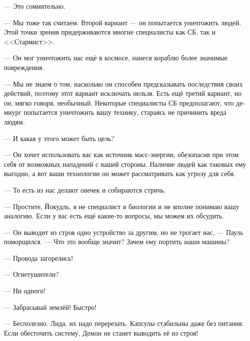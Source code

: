 \documentclass[a4paper,10pt,fleqn]{book}\usepackage{polyglossia}\setdefaultlanguage[babelshorthands=true]{russian}\setotherlanguage{english}\defaultfontfeatures{Ligatures=TeX,Mapping=tex-text}\usepackage{xcolor}\newcommand{\ml}[3]{#2}
\newcommand{\asterism}{\vspace{1em}{\centering\Large\bfseries$\ast~\ast~\ast$\par}\vspace{1em}}
\begin{document}
\ml{$0$}
{--- Это сомнительно.}
{``Hard to believe.''}

--- Мы тоже так считаем.
\ml{$0$}
{Второй вариант --- он попытается уничтожить людей.}
{The second option: it will try to wipe humans out.}
Этой точки зрения придерживаются многие специалисты как СБ, так и <<Стармист>>.

\ml{$0$}
{--- Он мог уничтожить нас ещё в космосе, нанеся кораблю более значимые повреждения.}
{``It could do it in space, causing more serious damage to the ship.''}

\ml{$0$}
{--- Мы не знаем о том, насколько он способен предсказывать последствия своих действий, поэтому этот вариант исключать нельзя.}
{``We know nothing about its ability to predict consequences of its actions, so that option cannot be excluded.}
\ml{$0$}
{Есть ещё третий вариант, но он, мягко говоря, необычный.}
{There is one more, but this option, to put it mildly, unusual.}
\ml{$0$}
{Некоторые специалисты СБ предполагают, что демиург попытается уничтожить вашу технику, стараясь не причинить вреда людям.}
{Some SSC specialists suggest that the demiurge will try to destroy your equipment and not to harm humans.''}

--- И какая у этого может быть цель?

--- Он хочет использовать вас как источник масс-энергии, обезопасив при этом себя от возможных нападений с вашей стороны.
Наличие людей как таковых ему выгодно, а вот ваши технологии он может рассматривать как угрозу для себя.

\ml{$0$}
{--- То есть из нас делают овечек и собираются стричь.}
{``So it will try to turn us into sheeps to shear.''}

\ml{$0$}
{--- Простите, Йокудль, я не специалист в биологии и не вполне понимаю вашу аналогию.}
{``I'm sorry, Jökull, I'm not an expert in biology, so I'm not sure I properly understand your analogy.}
Если у вас есть ещё какие-то вопросы, мы можем их обсудить.

\asterism

--- Он выводит из строя одно устройство за другим, но не трогает нас, --- Пауль поморщился.
--- Что это вообще значит?
Зачем ему портить наши машины?

\asterism

--- Провода загорелись!

--- Огнетушители?

--- Ни одного!

--- Забрасывай землёй!
Быстро!

--- Бесполезно.
Лида, их надо перерезать.
Капсулы стабильны даже без питания.
Если обесточить систему, Демон не станет выводить её из строя!
\end{document}
